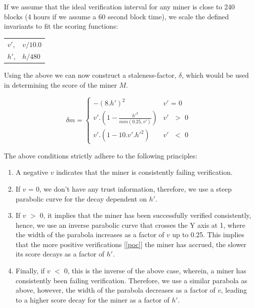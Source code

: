 \documentclass[10pt, nonatbib, nocopyrightspace, reprint]{sigplanconf}
\newcommand{\secref}[1]{[\autoref{#1}]}
\begin{document}
If we assume that the ideal verification interval for any miner is close to 240 blocks (4 hours if we assume a 60 second block time), we scale the defined invariants to fit the scoring functions:

\begin{tabular}{l l}
        $v'$, &$v/10.0$\\
        $h'$, &$h/480$ \\
\end{tabular}

Using the above we can now construct a staleness-factor, $\delta$, which would be used in determining the score of the miner $M$.

\begin{equation*} \label{equation:score1}
        \delta{m} = \begin{cases}
        	-(8.h')^{2}&\text{$v'$ = 0}\\
        	v'.(1 - \frac{h'^{2}}{min(0.25, v')})&\text{$v'$ $>$ 0}\\
        	v'.(1 - 10.v'.h'^{2})&\text{$v'$ $<$ 0}
        \end{cases}
\end{equation*}

The above conditions strictly adhere to the following principles:

\begin{enumerate}
  \item A negative $v$ indicates that the miner is consistently failing verification.
  
  \item If $v$ = 0, we don't have any trust information, therefore, we use a steep parabolic curve for the decay dependent on $h'$.
  
  \item If $v$ $>$ 0, it implies that the miner has been successfully verified consistently, hence, we use an inverse parabolic curve that crosses the Y axis at 1, where the width of the parabola increases as a factor of $v$ up to 0.25. This implies that the more positive verifications \secref{poc} the miner has accrued, the slower its score decays as a factor of $h'$.
   
  \item Finally, if $v$ $<$ 0, this is the inverse of the above case, wherein, a miner has consistently been failing verification. Therefore, we use a similar parabola as above, however, the width of the parabola decreases as a factor of $v$, leading to a higher score decay for the miner as a factor of $h'$.
  
\end{enumerate}
\end{document}
